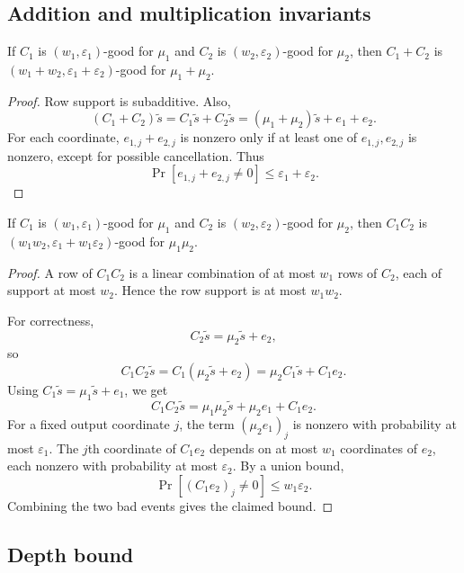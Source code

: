 \subsection{Addition and multiplication invariants}

\begin{lemma}
\label{lem:add-good}
If $C_1$ is $(w_1,\varepsilon_1)$-good for $\mu_1$ and $C_2$ is $(w_2,\varepsilon_2)$-good for $\mu_2$, then $C_1+C_2$ is $(w_1+w_2,\varepsilon_1+\varepsilon_2)$-good for $\mu_1+\mu_2$.
\end{lemma}

\begin{proof}
Row support is subadditive.  Also,
\[
    (C_1+C_2)\tilde{s}
    =C_1\tilde{s}+C_2\tilde{s}
    =(\mu_1+\mu_2)\tilde{s}+e_1+e_2.
\]
For each coordinate, $e_{1,j}+e_{2,j}$ is nonzero only if at least one of $e_{1,j},e_{2,j}$ is nonzero, except for possible cancellation.  Thus
\[
    \Pr[e_{1,j}+e_{2,j}\ne0]
    \le \varepsilon_1+\varepsilon_2.
\]
\end{proof}

\begin{lemma}
\label{lem:mul-good}
If $C_1$ is $(w_1,\varepsilon_1)$-good for $\mu_1$ and $C_2$ is $(w_2,\varepsilon_2)$-good for $\mu_2$, then $C_1C_2$ is $(w_1w_2,\varepsilon_1+w_1\varepsilon_2)$-good for $\mu_1\mu_2$.
\end{lemma}

\begin{proof}
A row of $C_1C_2$ is a linear combination of at most $w_1$ rows of $C_2$, each of support at most $w_2$.  Hence the row support is at most $w_1w_2$.

For correctness,
\[
    C_2\tilde{s}=\mu_2\tilde{s}+e_2,
\]
so
\[
    C_1C_2\tilde{s}=C_1(\mu_2\tilde{s}+e_2)=\mu_2C_1\tilde{s}+C_1e_2.
\]
Using $C_1\tilde{s}=\mu_1\tilde{s}+e_1$, we get
\[
    C_1C_2\tilde{s}=\mu_1\mu_2\tilde{s}+\mu_2e_1+C_1e_2.
\]
For a fixed output coordinate $j$, the term $(\mu_2e_1)_j$ is nonzero with probability at most $\varepsilon_1$.  The $j$th coordinate of $C_1e_2$ depends on at most $w_1$ coordinates of $e_2$, each nonzero with probability at most $\varepsilon_2$.  By a union bound,
\[
    \Pr[(C_1e_2)_j\ne0]\le w_1\varepsilon_2.
\]
Combining the two bad events gives the claimed bound.
\end{proof}

\subsection{Depth bound}

